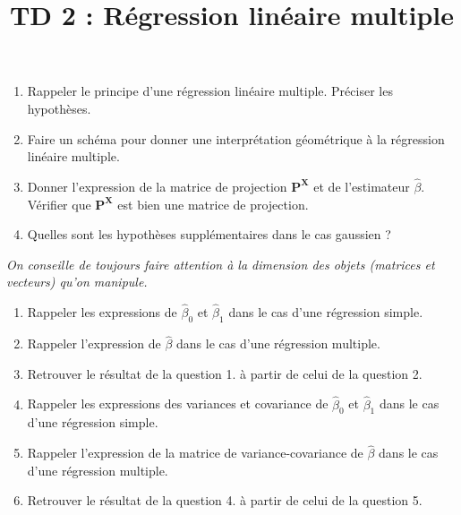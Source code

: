 \documentclass{../td_um}
\title{TD 2 : Régression linéaire multiple}
\providecommand{\1}{\mathds{1}}
\begin{document}
	\maketitle
	
	
	
	\begin{enumerate}
		\item Rappeler le principe d'une régression linéaire multiple. Préciser les hypothèses.
		\item Faire un schéma pour donner une interprétation géométrique à la régression linéaire multiple.
		\item Donner l'expression de la matrice de projection $\mathbf{P}^{\mathbf{X}}$ et de l'estimateur $\hat \beta$. Vérifier que $\mathbf{P}^{\mathbf{X}}$ est bien une matrice de projection.
		\item Quelles sont les hypothèses supplémentaires dans le cas gaussien ?
	\end{enumerate}
	\textit{On conseille de toujours faire attention à la dimension des objets (matrices et vecteurs) qu'on manipule.}
	
	
	\begin{enumerate}
		\item Rappeler les expressions de $\hat \beta_0$ et $\hat \beta_1$ dans le cas d'une régression simple.
		\item Rappeler l'expression de $\hat \beta$ dans le cas d'une régression multiple.
		\item Retrouver le résultat de la question 1. à partir de celui de la question 2.
		\item Rappeler les expressions des variances et covariance de $\hat \beta_0$ et $\hat \beta_1$ dans le cas d'une régression simple.
		\item Rappeler l'expression de la matrice de variance-covariance de $\hat \beta$ dans le cas d'une régression multiple.
		\item Retrouver le résultat de la question 4. à partir de celui de la question 5.
	\end{enumerate}

	\cor{\newpage}
\end{document}
